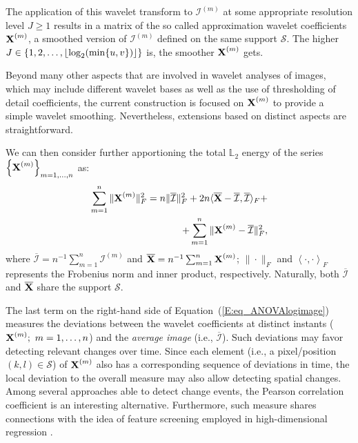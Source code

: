 \documentclass[journal]{IEEEtran}
\newcommand{\vX}{{\textbf X}}
\DeclarePairedDelimiter\floor{\lfloor}{\rfloor}
\begin{document}
The application of this wavelet transform to $\mathcal{I}^{(m)}$ at some appropriate resolution level $J\geq 1$ results in a matrix of the so called approximation wavelet coefficients $\vX^{(m)}$, a smoothed version of $\mathcal{I}^{(m)}$ 
defined on the same support $\mathcal{S}$. The higher $J\in\{1,2,\ldots, \floor{ \log_2( \min\{u,v\} ) } \}$ is, the smoother $\vX^{(m)}$ gets.

Beyond many other aspects that are involved in wavelet analyses of images, which may include different wavelet bases as well as the use of thresholding of detail coefficients, the current construction is focused on $\vX^{(m)}$ to provide a simple wavelet smoothing. Nevertheless, extensions based on distinct aspects are straightforward.

We can then consider further apportioning the total $\mathbb{L}_2$ energy of the series $\left\{\vX^{(m)}\right\}_{m=1,\ldots,n}$ as:
\begin{equation}\label{E:eq_ANOVAlogimage}
\begin{split}
\sum_{m=1}^n\|\vX^{(m)}\|_F^2
= n\|\overline{\mathcal{I}}\|_F^2 + 2n\langle\overline{\vX}-\overline{\mathcal{I}},\overline{\mathcal{I}}\rangle_F + \\
+ \sum_{m=1}^n\|\mathcal \vX^{(m)} - \overline{\mathcal{I}}\|_F^2,
\end{split}
\end{equation}
where $\overline{\mathcal{I}}=n^{-1}\sum_{m=1}^n\mathcal{I}^{(m)}$ and $\overline{\vX}=n^{-1}\sum_{m=1}^n\vX^{(m)}$; $\| \cdot \|_F$ and $\left\langle \cdot , \cdot \right\rangle_F$ represents the Frobenius norm and inner product, respectively. Naturally, both $\overline{\mathcal{I}}$ and $\overline{\vX}$ share the support $\mathcal{S}$.


The last term on the right-hand side of Equation~(\ref{E:eq_ANOVAlogimage}) measures the deviations between the wavelet coefficients at distinct instants ($\vX^{(m)}; \ m=1,\ldots,n$) and the \textit{average image} (i.e., $\overline{\mathcal{I}}$). Such deviations may favor detecting relevant changes over time. Since each element (i.e., a pixel/position $(k,l)\in \mathcal{S}$) of $\vX^{(m)}$ also has a corresponding sequence of deviations in time, the local deviation to the overall measure may also allow detecting spatial changes. Among several approaches able to detect change events, the Pearson correlation coefficient is an interesting alternative. Furthermore, such measure shares connections with the idea of feature screening employed in high-dimensional regression \cite{fan2008sure}.
\end{document}
